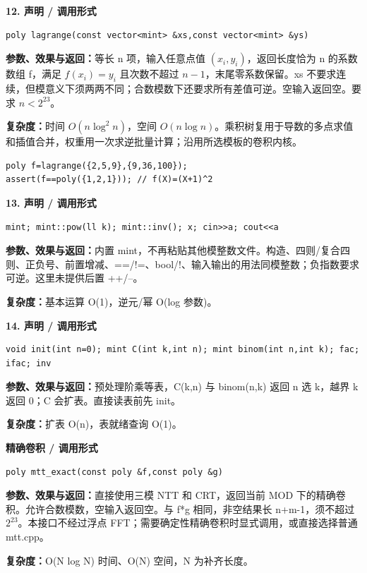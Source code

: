 \documentclass[UTF8,a4paper,10pt]{ctexart}
\begin{document}
\noindent\begin{minipage}{\textwidth}
\textbf{12. 声明 / 调用形式}
\begin{lstlisting}
poly lagrange(const vector<mint> &xs,const vector<mint> &ys)
\end{lstlisting}
\textbf{参数、效果与返回：}等长 n 项，输入任意点值 $(x_i,y_i)$，返回长度恰为 n 的系数数组 f，满足 $f(x_i)=y_i$ 且次数不超过 $n-1$，末尾零系数保留。xs 不要求连续，但模意义下须两两不同；合数模数下还要求所有差值可逆。空输入返回空。要求 $n<2^{23}$。

\textbf{复杂度：}时间 $O(n\log^2 n)$，空间 $O(n\log n)$。乘积树复用于导数的多点求值和插值合并，权重用一次求逆批量计算；沿用所选模板的卷积内核。

\begin{lstlisting}
poly f=lagrange({2,5,9},{9,36,100});
assert(f==poly({1,2,1})); // f(X)=(X+1)^2
\end{lstlisting}

\end{minipage}\par\vspace{0.4em}
\noindent\begin{minipage}{\textwidth}
\textbf{13. 声明 / 调用形式}
\begin{lstlisting}
mint; mint::pow(ll k); mint::inv(); x; cin>>a; cout<<a
\end{lstlisting}
\textbf{参数、效果与返回：}内置 mint，不再粘贴其他模整数文件。构造、四则/复合四则、正负号、前置增减、==/!=、bool/!、输入输出的用法同模整数；负指数要求可逆。这里未提供后置 ++/--。

\textbf{复杂度：}基本运算 O(1)，逆元/幂 O(log 参数)。

\end{minipage}\par\vspace{0.4em}
\noindent\begin{minipage}{\textwidth}
\textbf{14. 声明 / 调用形式}
\begin{lstlisting}
void init(int n=0); mint C(int k,int n); mint binom(int n,int k); fac; ifac; inv
\end{lstlisting}
\textbf{参数、效果与返回：}预处理阶乘等表，C(k,n) 与 binom(n,k) 返回 n 选 k，越界 k 返回 0；C 会扩表。直接读表前先 init。

\textbf{复杂度：}扩表 O(n)，表就绪查询 O(1)。

\end{minipage}\par\vspace{0.4em}
\noindent\begin{minipage}{\textwidth}
\textbf{精确卷积 / 调用形式}
\begin{lstlisting}
poly mtt_exact(const poly &f,const poly &g)
\end{lstlisting}
\textbf{参数、效果与返回：}直接使用三模 NTT 和 CRT，返回当前 MOD 下的精确卷积。允许合数模数，空输入返回空。与 f*g 相同，非空结果长 n+m-1，须不超过 $2^{23}$。本接口不经过浮点 FFT；需要确定性精确卷积时显式调用，或直接选择普通 mtt.cpp。

\textbf{复杂度：}O(N log N) 时间、O(N) 空间，N 为补齐长度。
\end{minipage}\par\vspace{0.4em}
\end{document}
